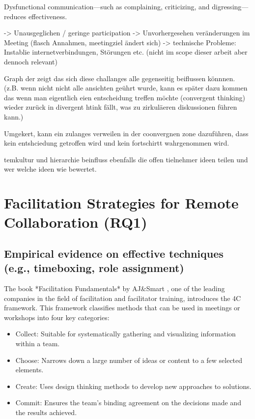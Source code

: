 Dysfunctional communication—such as complaining, criticizing, and digressing—reduces effectiveness.
\cite[130]{kauffeldMeetingsMatterEffects2012}

-> Unausgeglichen / geringe participation
-> Unvorhergesehen veränderungen im Meeting (flasch Annahmen, meetingziel ändert sich)
-> technische Probleme: Instablie internetverbindungen, Störungen etc. (nicht im scope dieser arbeit aber
dennoch relevant)

Graph der zeigt das sich diese challanges alle gegenseitig beiflussen könnnen. (z.B. wenn nicht nicht alle
  ansichten geührt wurde, kann es später dazu kommen das wenn man eigentlich eien entscheidung treffen möchte
(convergent thinking) wieder zurück in divergent htink fällt, was zu zirkuläeren diskussionen führen kann.)

Umgekert, kann ein zulanges verweilen in der coonvergnen zone dazuführen, dass kein entshciedung getroffen
wird und kein fortschirtt wahrgenommen wird.

temkultur und hierarchie beinfluss ebenfalls die offen tielnehmer ideen teilen und wer welche ideen wie bewertet.
\section{Facilitation Strategies for Remote Collaboration (RQ1)}
\subsection{Empirical evidence on effective techniques (e.g., timeboxing, role assignment)}

The book *Facilitation Fundamentals* by AJ\&Smart \cite{aj&smartFacilitationFundamentalsWorkbook}, one of the
leading companies in the field of facilitation and facilitator training, introduces the 4C framework. This framework
classifies methods that can be used in meetings or workshops into four key categories:

\begin{itemize}
  \item Collect: Suitable for systematically gathering and visualizing information within a team.
  \item Choose: Narrows down a large number of ideas or content to a few selected elements.
  \item Create: Uses design thinking methods to develop new approaches to solutions.
  \item Commit: Ensures the team’s binding agreement on the decisions made and the results achieved.
\end{itemize}

